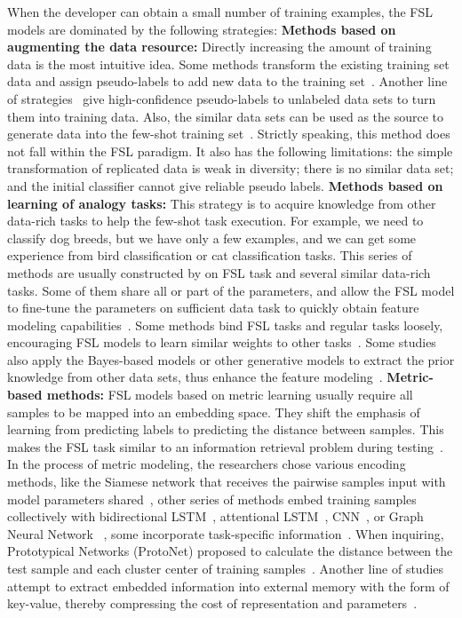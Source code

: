 When the developer can obtain a small number of training examples, the FSL models are dominated by the following strategies:
\textbf{Methods based on augmenting the data resource:} Directly increasing the amount of training data is the most intuitive idea. Some methods transform the existing training set data and assign pseudo-labels to add new data to the training set~. Another line of strategies~ give high-confidence pseudo-labels to unlabeled data sets to turn them into training data. Also, the similar data sets can be used as the source to generate data into the few-shot training set~. Strictly speaking, this method does not fall within the FSL paradigm. It also has the following limitations: the simple transformation of replicated data is weak in diversity; there is no similar data set; and the initial classifier cannot give reliable pseudo labels.
\textbf{Methods based on learning of analogy tasks:} This strategy is to acquire knowledge from other data-rich tasks to help the few-shot task execution. For example, we need to classify dog breeds, but we have only a few examples, and we can get some experience from bird classification or cat classification tasks. This series of methods are usually constructed by on FSL task and several similar data-rich tasks. Some of them share all or part of the parameters, and allow the FSL model to fine-tune the parameters on sufficient data task to quickly obtain feature modeling capabilities~. Some methods bind FSL tasks and regular tasks loosely, encouraging FSL models to learn similar weights to other tasks~. Some studies also apply the Bayes-based models or other generative models to extract the prior knowledge from other data sets, thus enhance the feature modeling~.
\textbf{Metric-based methods:} FSL models based on metric learning usually require all samples to be mapped into an embedding space. They shift the emphasis of learning from predicting labels to predicting the distance between samples. This makes the FSL task  similar to an information retrieval problem during testing~. In the process of metric modeling, the researchers chose various encoding methods, like the Siamese network that receives the pairwise samples input with model parameters shared~, other series of methods embed training samples collectively with bidirectional LSTM~, attentional LSTM~, CNN~, or Graph Neural Network ~, some incorporate task-specific information~. When inquiring, Prototypical Networks (ProtoNet) proposed to calculate the distance between the test sample and each cluster center of training samples~. Another line of studies attempt to extract embedded information into external memory with the form of key-value, thereby compressing the cost of representation and parameters~.
